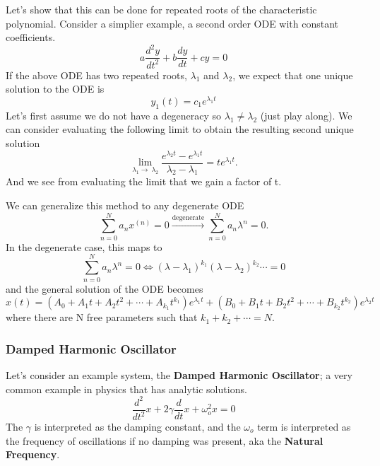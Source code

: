 \documentclass{article}
\newcommand{\be}{\begin{equation}}
\newcommand{\ee}{\end{equation}}
\begin{document}
Let's show that this can be done for repeated roots of the characteristic polynomial.
Consider a simplier example, a second order ODE with constant coefficients.
\be \label{eq:lin_cc_homo_reproot}
a\frac{d^2 y}{dt^2} + b\frac{d y}{dt} + cy = 0
\ee
If the above ODE has two repeated roots, $\lambda_1$ and $\lambda_2$, we expect that one unique solution to the ODE is
\be
y_1(t) = c_1 e^{\lambda_1 t}
\ee
Let's first assume we do not have a degeneracy so $\lambda_1 \neq \lambda_2$ (just play along). 
We can consider evaluating the following limit to obtain the resulting second unique solution
\be
\lim_{\lambda_1\to\ \lambda_2} \frac{e^{\lambda_2 t} - e^{\lambda_1 t}}{\lambda_2 - \lambda_1} = t e^{\lambda_1 t} .
\ee
And we see from evaluating the limit that we gain a factor of t.

We can generalize this method to any degenerate ODE
\be
\sum_{n=0}^N a_n x^{(n)} = 0 \xrightarrow{\text{degenerate}} \sum_{n=0}^N a_n \lambda^n = 0 .
\ee
In the degenerate case, this maps to
\be
\sum_{n=0}^N a_n \lambda^n = 0 \Leftrightarrow (\lambda - \lambda_1)^{k_1} (\lambda - \lambda_2)^{k_2} \cdots = 0
\ee
and the general solution of the ODE becomes
\be
x(t) = \left( A_0 + A_1t + A_2t^2 + \cdots + A_{k_1} t^{k_1}\right) e^{\lambda_1t} + \left( B_0 + B_1t + B_2t^2 + \cdots + B_{k_2} t^{k_2}\right) e^{\lambda_2t}
\ee
where there are N free parameters such that $k_1 + k_2 + \cdots = N$.

\subsubsection*{Damped Harmonic Oscillator}
Let's consider an example system, the \textbf{Damped Harmonic Oscillator}; a very common example in physics that has analytic solutions.
\be \label{eq:damp_oscillator}
\frac{d^2}{dt^2} x + 2\gamma \frac{d}{dt} x + \omega_o^2 x = 0
\ee
The $\gamma$ is interpreted as the damping constant, and the $\omega_o$ term is interpreted as the frequency of oscillations if no damping was present, aka the \textbf{Natural Frequency}.
\end{document}
